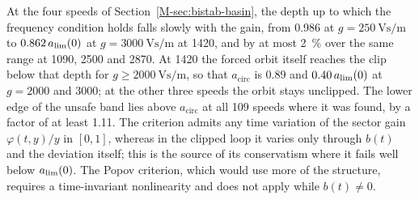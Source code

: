 At the four speeds of Section~\ref{M-sec:bistab-basin}, the depth up to which the frequency condition holds falls slowly with the gain, from 0.986 at $g=\SI{250}{\volt\second\per\metre}$ to $0.862\,a_{\lim}(0)$ at $g=\SI{3000}{\volt\second\per\metre}$ at \SI{1420}{\rpm}, and by at most \SI{2}{\percent} over the same range at 1090, 2500 and \SI{2870}{\rpm}. At \SI{1420}{\rpm} the forced orbit itself reaches the clip below that depth for $g\ge\SI{2000}{\volt\second\per\metre}$, so that $a_{\mathrm{circ}}$ is 0.89 and $0.40\,a_{\lim}(0)$ at $g=2000$ and 3000; at the other three speeds the orbit stays unclipped. The lower edge of the unsafe band lies above $a_{\mathrm{circ}}$ at all 109 speeds where it was found, by a factor of at least 1.11. The criterion admits any time variation of the sector gain $\varphi(t,y)/y$ in $[0,1]$, whereas in the clipped loop it varies only through $b(t)$ and the deviation itself; this is the source of its conservatism where it fails well below $a_{\lim}(0)$. The Popov criterion, which would use more of the structure, requires a time-invariant nonlinearity and does not apply while $b(t)\neq0$.

